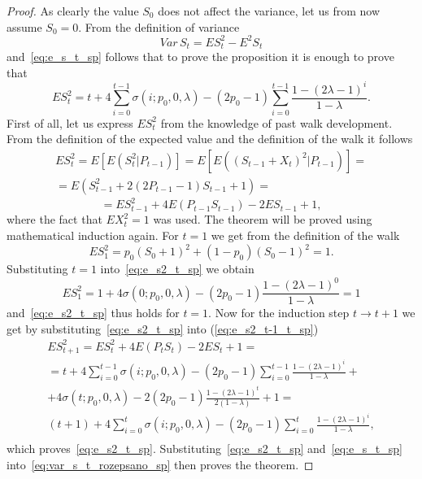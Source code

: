 \documentclass[runningheads]{CMSIM}
\begin{document}
    \begin{proof}
        As clearly the value $S_{0}$ does not affect the variance, let us
        from now assume $S_{0}=0$.
        From the definition of variance
        \begin{equation}
            Var\,S_{t}=ES_{t}^{2}-E^{2}S_{t}\label{eq:var_s_t_rozepsano_sp}
        \end{equation}
        and~\eqref{eq:e_s_t_sp} follows that to prove the proposition it
        is enough to prove that
        \begin{equation}
            ES_{t}^{2}=t+4\sum_{i=0}^{t-1}\sigma(i;p_{0},0,\lambda)-(2p_{0}-1)\sum_{i=0}^{t-1}\frac{1-(2\lambda-1)^{i}}{1-\lambda}.\label{eq:e_s2_t_sp}
        \end{equation}
        First of all, let us express $ES_{t}^{2}$ from the knowledge of past
        walk development.
        From the definition of the expected value and the
        definition of the walk it follows
        \begin{gather*}
            ES_{t}^{2}=E[E(S_{t}^{2}|P_{t-1})]=E[E((S_{t-1}+X_{t})^{2}|P_{t-1})]=\\
            =E(S_{t-1}^{2}+2(2P_{t-1}-1)S_{t-1}+1)=
        \end{gather*}
        \begin{equation}
            =ES_{t-1}^{2}+4E(P_{t-1}S_{t-1})-2ES_{t-1}+1,\label{eq:e_s2_t-1_t_sp}
        \end{equation}
        where the fact that $EX_{t}^{2}=1$ was used.
        The theorem will be proved using mathematical induction again.
        For $t=1$ we get from the definition of the walk
        \[
            ES_{1}^{2}=p_{0}(S_{0}+1)^{2}+(1-p_{0})(S_{0}-1)^{2}=1.
        \]
        Substituting $t=1$ into~\eqref{eq:e_s2_t_sp} we obtain
        \[
            ES_{1}^{2}=1+4\sigma(0;p_{0},0,\lambda)-(2p_{0}-1)\frac{1-(2\lambda-1)^{0}}{1-\lambda}=1
        \]
        and~\eqref{eq:e_s2_t_sp} thus holds for $t=1$.
        Now for the induction
        step $t\rightarrow t+1$ we get by substituting~\eqref{eq:e_s2_t_sp}
        into (\ref{eq:e_s2_t-1_t_sp})
        \begin{gather*}
            ES_{t+1}^{2}=ES_{t}^{2}+4E(P_{t}S_{t})-2ES_{t}+1=\\
            =t+4\sum_{i=0}^{t-1}\sigma(i;p_{0},0,\lambda)-(2p_{0}-1)\sum_{i=0}^{t-1}\frac{1-(2\lambda-1)^{i}}{1-\lambda}+\\
            +4\sigma(t;p_{0},0,\lambda)-2(2p_{0}-1)\frac{1-(2\lambda-1)^{t}}{2(1-\lambda)}+1=\\
            (t+1)+4\sum_{i=0}^{t}\sigma(i;p_{0},0,\lambda)-(2p_{0}-1)\sum_{i=0}^{t}\frac{1-(2\lambda-1)^{i}}{1-\lambda},\\
        \end{gather*}
        which proves~\eqref{eq:e_s2_t_sp}.
        Substituting~\eqref{eq:e_s2_t_sp}
        and~\eqref{eq:e_s_t_sp} into~\eqref{eq:var_s_t_rozepsano_sp} then
        proves the theorem.
    \end{proof}
\end{document}
